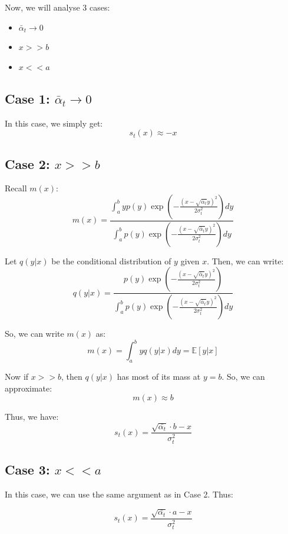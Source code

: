 \documentclass[11pt, a4paper]{article}
\begin{document}
\noindent Now, we will analyse 3 cases:
\begin{itemize}
  \item $\bar{\alpha}_t \rightarrow 0$
  \item $x >> b$
  \item $x << a$
\end{itemize}

\subsection{Case 1: $\bar{\alpha}_t \rightarrow 0$}
In this case, we simply get:
\[
  s_t(x) \approx -x
\]

\vspace{2em}
\subsection{Case 2: $x >> b$}
Recall $m(x)$:
\[
m(x) = \dfrac{\displaystyle \int_{a}^{b} y p(y) \exp\left(-\frac{(x - \sqrt{\bar{\alpha}_t} y)^2}{2\sigma_t^2}\right) dy}{\displaystyle \int_{a}^{b} p(y) \exp\left(-\frac{(x - \sqrt{\bar{\alpha}_t} y)^2}{2\sigma_t^2}\right) dy}
\]

\noindent Let $q(y|x)$ be the conditional distribution of $y$ given $x$. Then, we can write:
\[
  q(y|x) = \dfrac{p(y) \exp\left(-\frac{(x - \sqrt{\bar{\alpha}_t} y)^2}{2\sigma_t^2}\right)}{\displaystyle \int_{a}^{b} p(y) \exp\left(-\frac{(x - \sqrt{\bar{\alpha}_t} y)^2}{2\sigma_t^2}\right) dy}
\]

\noindent So, we can write $m(x)$ as:
\[
m(x) = \int_{a}^{b} y q(y|x) dy = \mathbb{E}[y|x]
\]

\noindent Now if $x >> b$, then $q(y|x)$ has most of its mass at $y = b$. So, we can approximate:
\[
m(x) \approx b
\]

\noindent Thus, we have:
\[
s_t(x) = \frac{\sqrt{\bar{\alpha_t}} \cdot b - x}{\sigma_t^2}
\]

\vspace{2em}
\subsection{Case 3: $x << a$}
In this case, we can use the same argument as in Case 2. Thus:

\[
  s_t(x) = \frac{\sqrt{\bar{\alpha_t}} \cdot a - x}{\sigma_t^2}
\]
\end{document}

